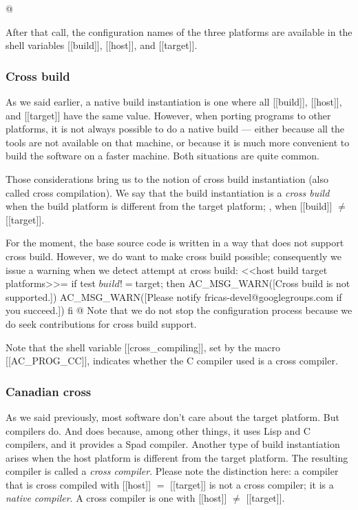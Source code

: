 \documentclass[12pt]{article}
\begin{document}
@

After that call, the configuration names of the three platforms
are available in the shell variables [[build]], [[host]], and [[target]].

\subsubsection{Cross build}

As we said earlier, a native build instantiation is one where all
[[build]], [[host]], and [[target]] have the same value.  However,
when porting programs to other platforms, it is not always possible
to do a native build --- either because all the tools are not
available on that machine, or because it is much more convenient to
build the software on a faster machine. Both situations are quite
common.

Those considerations bring us to the notion of cross build
instantiation (also called cross compilation).
We say that the build instantiation is a \emph{cross build} when
the build platform is different from the target platform; \eg{}, when
[[build]] $\neq$ [[target]].

For the moment, the  base source code is written
in a way that does not support cross build.  However, we do
want to make cross build possible; consequently we issue
a warning when we detect attempt at cross build:
<<host build target platforms>>=
if test $build != $target; then
   AC_MSG_WARN([Cross build is not supported.])
   AC_MSG_WARN([Please notify fricas-devel@googlegroups.com if you succeed.])
fi
@
Note that we do not stop the configuration process because we do seek
contributions for cross build support.

Note that the shell variable [[cross_compiling]],
set by the  macro [[AC_PROG_CC]], indicates whether
the C compiler used is a cross compiler.

\subsubsection{Canadian cross}

As we said previously, most software don't care about the target
platform.  But compilers do.  And  does because, among
other things, it uses Lisp and C compilers, and it provides a Spad compiler.
Another type of build instantiation arises when the host platform
is different from the target platform.  The resulting compiler
is called a \emph{cross compiler}.  Please note the distinction here:
a compiler that is cross compiled with [[host]] $=$ [[target]] is
not a cross compiler; it is a \emph{native compiler}.
A cross compiler is one with [[host]] $\neq$ [[target]].
\end{document}
